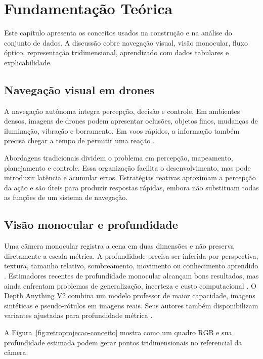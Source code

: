 \chapter{Fundamentação Teórica}\label{cap:fundamentacao}

Este capítulo apresenta os conceitos usados na construção e na análise do conjunto de dados. A discussão cobre navegação visual, visão monocular, fluxo óptico, representação tridimensional, aprendizado com dados tabulares e explicabilidade.

\section{Navegação visual em drones}

A navegação autônoma integra percepção, decisão e controle. Em ambientes densos, imagens de drones podem apresentar oclusões, objetos finos, mudanças de iluminação, vibração e borramento. Em voos rápidos, a informação também precisa chegar a tempo de permitir uma reação \cite{Loquercio2021,Ramachandran2021}.

Abordagens tradicionais dividem o problema em percepção, mapeamento, planejamento e controle. Essa organização facilita o desenvolvimento, mas pode introduzir latência e acumular erros. Estratégias reativas aproximam a percepção da ação e são úteis para produzir respostas rápidas, embora não substituam todas as funções de um sistema de navegação.

\section{Visão monocular e profundidade}

Uma câmera monocular registra a cena em duas dimensões e não preserva diretamente a escala métrica. A profundidade precisa ser inferida por perspectiva, textura, tamanho relativo, sombreamento, movimento ou conhecimento aprendido \cite{Vyas2022,Arampatzakis2024}. Estimadores recentes de profundidade monocular alcançam bons resultados, mas ainda enfrentam problemas de generalização, incerteza e custo computacional \cite{RealTimeMonocular2022,Liu2023,Dhanushkodi2025}. O Depth Anything V2 combina um modelo professor de maior capacidade, imagens sintéticas e pseudo-rótulos em imagens reais. Seus autores também disponibilizam variantes ajustadas para profundidade métrica \cite{DepthAnythingV2}. 

A Figura~\ref{fig:retroprojecao-conceito} mostra como um quadro RGB e sua profundidade estimada podem gerar pontos tridimensionais no referencial da câmera.

